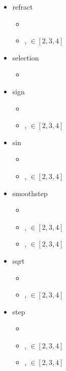 \documentclass{article}
\begin{document}
\begin{itemize}
\begin{itemize}
\end{itemize}\item refract \begin{itemize}
\item {}
\item {},  $\in [2, 3, 4]$

\end{itemize}\item selection \begin{itemize}
\item {}

\end{itemize}\item sign \begin{itemize}
\item {}
\item {},  $\in [2, 3, 4]$

\end{itemize}\item sin \begin{itemize}
\item {}
\item {},  $\in [2, 3, 4]$

\end{itemize}\item smoothstep \begin{itemize}
\item {}
\item {},  $\in [2, 3, 4]$
\item {},  $\in [2, 3, 4]$

\end{itemize}\item sqrt \begin{itemize}
\item {}
\item {},  $\in [2, 3, 4]$

\end{itemize}\item step \begin{itemize}
\item {}
\item {},  $\in [2, 3, 4]$
\item {},  $\in [2, 3, 4]$


\end{itemize}
\end{itemize}
\end{document}

